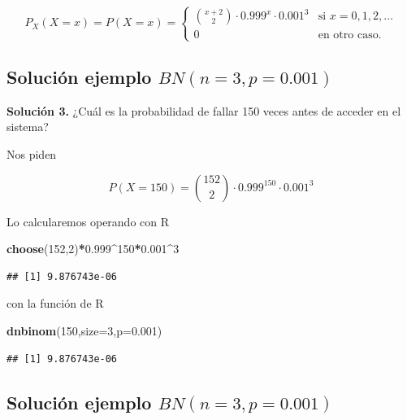 \documentclass[]{book}
\newenvironment{Shaded}{\begin{snugshade}}{\end{snugshade}}
\newcommand{\DataTypeTok}[1]{\textcolor[rgb]{0.13,0.29,0.53}{#1}}
\newcommand{\DecValTok}[1]{\textcolor[rgb]{0.00,0.00,0.81}{#1}}
\newcommand{\FloatTok}[1]{\textcolor[rgb]{0.00,0.00,0.81}{#1}}
\newcommand{\KeywordTok}[1]{\textcolor[rgb]{0.13,0.29,0.53}{\textbf{#1}}}
\newcommand{\NormalTok}[1]{#1}
\newcommand{\OperatorTok}[1]{\textcolor[rgb]{0.81,0.36,0.00}{\textbf{#1}}}
\begin{document}
\[
P_X(X=x)=P(X=x)=
\left\{
\begin{array}{cc} 
{x+2\choose 2} \cdot 0.999^{x}\cdot 0.001^3 & \mbox{si }  x=0,1,2,\ldots \\ 0 & \mbox{en otro caso.}\end{array}\right.
\]

\hypertarget{soluciuxf3n-ejemplo-bnn3p0.001}{%
\subsection{\texorpdfstring{Solución ejemplo \(BN(n=3,p=0.001)\)}{Solución ejemplo BN(n=3,p=0.001)}}\label{soluciuxf3n-ejemplo-bnn3p0.001}}

\textbf{Solución 3.} ¿Cuál es la probabilidad de fallar 150 veces antes de acceder en el sistema?

Nos piden

\[
P(X=150)= {152\choose 2} \cdot 0.999^{150}\cdot 0.001^3
\]

Lo calcularemos operando con R

\begin{Shaded}
\begin{Highlighting}[]
\KeywordTok{choose}\NormalTok{(}\DecValTok{152}\NormalTok{,}\DecValTok{2}\NormalTok{)}\OperatorTok{*}\FloatTok{0.999}\OperatorTok{^}\DecValTok{150}\OperatorTok{*}\FloatTok{0.001}\OperatorTok{^}\DecValTok{3}
\end{Highlighting}
\end{Shaded}

\begin{verbatim}
## [1] 9.876743e-06
\end{verbatim}

con la función de R

\begin{Shaded}
\begin{Highlighting}[]
\KeywordTok{dnbinom}\NormalTok{(}\DecValTok{150}\NormalTok{,}\DataTypeTok{size=}\DecValTok{3}\NormalTok{,}\DataTypeTok{p=}\FloatTok{0.001}\NormalTok{)}
\end{Highlighting}
\end{Shaded}

\begin{verbatim}
## [1] 9.876743e-06
\end{verbatim}

\hypertarget{soluciuxf3n-ejemplo-bnn3p0.001-1}{%
\subsection{\texorpdfstring{Solución ejemplo \(BN(n=3,p=0.001)\)}{Solución ejemplo BN(n=3,p=0.001)}}\label{soluciuxf3n-ejemplo-bnn3p0.001-1}}
\end{document}
